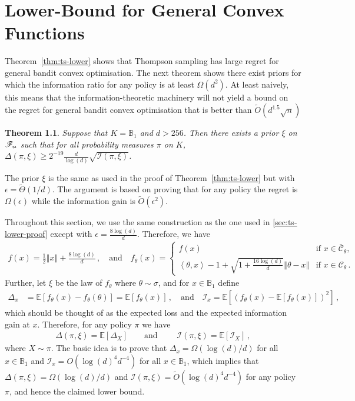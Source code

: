\documentclass[letter, 12pt]{report}
\newcommand{\todoa}[2][]{\todo[size=\scriptsize,color=green!20!white,#1]{Alr: #2}}
\newcommand{\pb}{\text{\tiny\texttt{b}}}
\newcommand{\pl}{\text{\tiny\texttt{l}}}
\newcommand{\ip}[1]{\left \langle #1 \right \rangle}
\newcommand{\ball}{\mathbb{B}}
\newcommand{\paren}[1]{\left( #1 \right)}
\newcommand{\brak}[1]{\left[ #1 \right]}
\newcommand{\norm}[1]{\left \Vert  #1 \right \Vert}
\newcommand{\E}{\mathbb E}
\newcommand{\cC}{\mathcal C}
\newcommand{\sF}{\mathscr F}
\newcommand{\I}{\mathcal{I}}
\newcommand{\1}{\mathbf{1}}
\theoremstyle{plain}
\newtheorem{theorem}{Theorem}
\theoremstyle{definition}
\theoremstyle{remark}
\begin{document}
\chapter{ Lower-‌‌Bound for General Convex Functions}
Theorem~\ref{thm:ts-lower} shows that Thompson sampling has large regret for general bandit convex optimisation.
The next theorem shows there exist priors for which the information ratio for any policy is at least $\Omega(d^2)$.
At least naively, this means that the information-theoretic machinery will not yield a bound on the regret for general bandit convex optimisation that
is better than $\tilde O(d^{1.5} \sqrt{n})$

\begin{theorem}\label{thm:inf-lower}
    Suppose that $K = \ball_1$ and $d>256$. Then there exists a prior $\xi$ on $\sF_{\pb\pl}$ such that for all probability measures $\pi$ on $K$,
    $\Delta(\pi, \xi) \geq 2^{-19} \frac{d}{\log(d)} \sqrt{\I(\pi, \xi)}$. %
\end{theorem}

The prior $\xi$ is the same as used in the proof of Theorem~\ref{thm:ts-lower} but with $\epsilon = \tilde \Theta(1/d)$.
The argument is based on proving that for any policy the regret is $\Omega(\epsilon)$ while the information gain is $\tilde O(\epsilon^2)$.

Throughout this section, we use the same construction as the one used in \cref{sec:ts-lower-proof}
except with $\epsilon = \frac{8\log(d)}{d}$.
Therefore, we have
\begin{align*}
    f(x)         = \frac12 \norm{x} + \frac{8\log(d)}{d}\,, \quad \text{and} \quad
    f_\theta(x)  =
    \begin{cases}
        f(x)                                                                 & \text{if } x \in \bar{\cC}_{\theta}, \\
        \ip{\theta, x} - 1 + \sqrt{1 + \frac{16\log(d)}{d}}\norm{\theta - x} & \text{if } x \in \cC_{\theta}\,.
    \end{cases}
\end{align*}
Further, let $\xi$ be the law of $f_\theta$ where $\theta \sim \sigma$,
and for $x \in \mathbb{B}_1$ define
\begin{align*}
    \Delta_x & = \E\brak{
        f_\theta(x) - f_{\theta}(\theta)
    }
    = \E\brak{
        f_\theta(x)
    }\,, \quad \text{and} \quad
    \I_x = \E\brak{
        \paren{f_\theta(x) - \E\brak{f_\theta(x)}}^2
    } \,,
\end{align*}
which should be thought of as the expected loss and the expected information gain at $x$.
Therefore, for any policy $\pi$ we have
\begin{align*}
    \Delta(\pi, \xi) = \E[\Delta_X] \qquad \text{and } \qquad
    \I(\pi, \xi) = \E[\I_X] \,,
\end{align*}
where $X \sim \pi$.
The basic idea is to prove that $\Delta_x = \Omega(\log(d)/d)$ for all
$x \in \ball_1$ and $\I_x = O(\log(d)^4 d^{-4})$ for all $x \in \ball_1$,
which implies that $\Delta(\pi, \xi) = \Omega(\log(d)/d)$ and $\I(\pi, \xi) = \tilde O(\log(d)^4 d^{-4})$
for any policy $\pi$, and hence the claimed lower bound.
\end{document}
